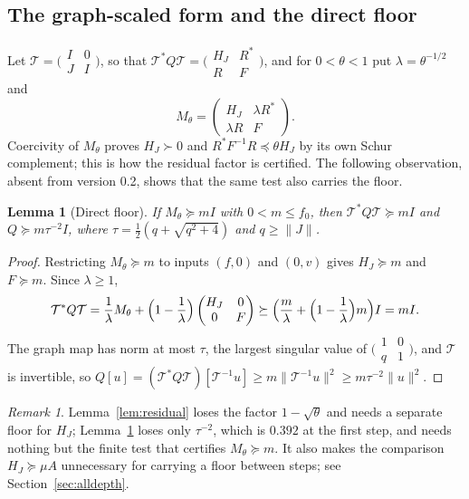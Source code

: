 \documentclass[11pt]{article}
\numberwithin{equation}{section}
\newtheorem{lemma}[theorem]{Lemma}
\theoremstyle{definition}
\theoremstyle{remark}
\newtheorem{remark}[theorem]{Remark}
\newcommand{\norm}[1]{\lVert#1\rVert}
\begin{document}
\subsection{The graph-scaled form and the direct floor}
Let $\mathcal T=\bigl(\begin{smallmatrix}I&0\\J&I\end{smallmatrix}\bigr)$, so that $\mathcal T^*Q\mathcal T=\bigl(\begin{smallmatrix}H_J&R^*\\R&F\end{smallmatrix}\bigr)$, and for $0<\theta<1$ put $\lambda=\theta^{-1/2}$ and
\begin{equation}\label{eq:Mtheta}
 M_\theta=\begin{pmatrix}H_J&\lambda R^*\\\lambda R&F\end{pmatrix}.
\end{equation}
Coercivity of $M_\theta$ proves $H_J\succ0$ and $R^*F^{-1}R\preceq\theta H_J$ by its own Schur complement; this is how the residual factor is certified. The following observation, absent from version 0.2, shows that the same test also carries the floor.

\begin{lemma}[Direct floor]\label{lem:directfloor}
If $M_\theta\succeq mI$ with $0<m\le f_0$, then $\mathcal T^*Q\mathcal T\succeq mI$ and $Q\succeq m\tau^{-2}I$, where $\tau=\tfrac12(q+\sqrt{q^2+4})$ and $q\ge\norm J$.
\end{lemma}
\begin{proof}
Restricting $M_\theta\succeq m$ to inputs $(f,0)$ and $(0,v)$ gives $H_J\succeq m$ and $F\succeq m$. Since $\lambda\ge1$,
\[
 \mathcal T^*Q\mathcal T=\frac1\lambda M_\theta+\Bigl(1-\frac1\lambda\Bigr)\begin{pmatrix}H_J&0\\0&F\end{pmatrix}\succeq\Bigl(\frac m\lambda+\Bigl(1-\frac1\lambda\Bigr)m\Bigr)I=mI .
\]
The graph map has norm at most $\tau$, the largest singular value of $\bigl(\begin{smallmatrix}1&0\\q&1\end{smallmatrix}\bigr)$, and $\mathcal T$ is invertible, so $Q[u]=(\mathcal T^*Q\mathcal T)[\mathcal T^{-1}u]\ge m\norm{\mathcal T^{-1}u}^2\ge m\tau^{-2}\norm u^2$.
\end{proof}

\begin{remark}
Lemma~\ref{lem:residual} loses the factor $1-\sqrt\theta$ and needs a separate floor for $H_J$; Lemma~\ref{lem:directfloor} loses only $\tau^{-2}$, which is $0.392$ at the first step, and needs nothing but the finite test that certifies $M_\theta\succeq m$. It also makes the comparison $H_J\succeq\mu A$ unnecessary for carrying a floor between steps; see Section~\ref{sec:alldepth}.
\end{remark}
\end{document}
